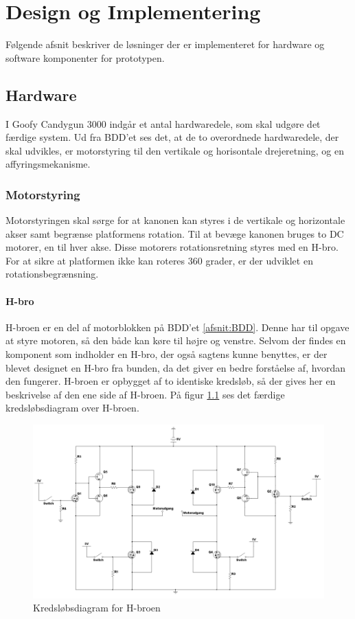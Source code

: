 \chapter{Design og Implementering}
Følgende afsnit beskriver de løsninger der er implementeret for hardware og software komponenter for prototypen. 

\section{Hardware}
I Goofy Candygun 3000 indgår et antal hardwaredele, som skal udgøre det færdige system. Ud fra BDD'et ses det, at de to overordnede hardwaredele, der skal udvikles, er motorstyring til den vertikale og horisontale drejeretning, og en affyringsmekanisme. 

\subsection{Motorstyring}
Motorstyringen skal sørge for at kanonen kan styres i de vertikale og horizontale akser samt begrænse platformens rotation. Til at bevæge kanonen  bruges to DC motorer, en til hver akse. Disse motorers rotationsretning styres med en H-bro. For at sikre at platformen ikke kan roteres 360 grader, er der udviklet en rotationsbegrænsning. 

\subsubsection{H-bro}
H-broen er en del af motorblokken på BDD'et \ref{afsnit:BDD}. Denne har til opgave at styre motoren, så den både kan køre til højre og venstre. Selvom der findes en komponent som indholder en H-bro, der også sagtens kunne benyttes, er der blevet designet en H-bro fra bunden, da det giver en bedre forståelse af, hvordan den fungerer. H-broen er opbygget af to identiske kredsløb, så der gives her en beskrivelse af den ene side af H-broen. På figur \ref{fig:hbro} ses det færdige kredsløbsdiagram over H-broen. 

\begin{figure}[H]
		\centering
		\includegraphics[width=\textwidth]{Afsnit/DesignOgImplementering/images/H-bro}
		\caption{Kredsløbsdiagram for H-broen}
		\label{fig:hbro}
\end{figure}

